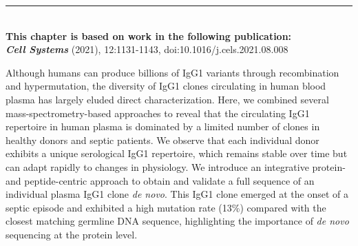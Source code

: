 \begin{flushleft}
  \vspace*{\fill}
  \rule{\textwidth}{1pt}\\[0cm]
  \textbf{This chapter is based on work in the following publication:}\\
  \footnotesize
  \textbf{\emph{Cell Systems}} (2021), 12:1131-1143, doi:10.1016/j.cels.2021.08.008\\
  \footnotesize
\end{flushleft}
\begin{abstract102}
  Although humans can produce billions of IgG1 variants through recombination and hypermutation, the diversity of IgG1 clones circulating in human blood plasma has largely eluded direct characterization. Here, we combined several mass-spectrometry-based approaches to reveal that the circulating IgG1 repertoire in human plasma is dominated by a limited number of clones in healthy donors and septic patients. We observe that each individual donor exhibits a unique serological IgG1 repertoire, which remains stable over time but can adapt rapidly to changes in physiology. We introduce an integrative protein- and peptide-centric approach to obtain and validate a full sequence of an individual plasma IgG1 clone \emph{de novo}. This IgG1 clone emerged at the onset of a septic episode and exhibited a high mutation rate (13\%) compared with the closest matching germline DNA sequence, highlighting the importance of \emph{de novo} sequencing at the protein level.
\end{abstract102}
\thumbforchapter

